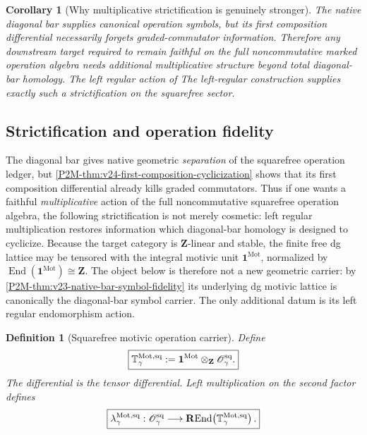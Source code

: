 \documentclass[11pt]{article}
\newtheorem{corollary}[theorem]{Corollary}
\newtheorem{definition}[theorem]{Definition}
\theoremstyle{remark}
\newcommand{\Z}{\mathbf Z}
\newcommand{\REnd}{\mathbf R\!\operatorname{End}}
\newcommand{\Mot}{\mathrm{Mot}}
\begin{document}
\begin{corollary}[Why multiplicative strictification is genuinely stronger]
\label{P2M-cor:v24-regular-strictification-necessary}
The native diagonal bar supplies canonical operation symbols, but its first
composition differential necessarily forgets graded-commutator information.
Therefore any downstream target required to remain faithful on the full
noncommutative marked operation algebra needs additional multiplicative
structure beyond total diagonal-bar homology.  The left regular action of
The left-regular construction supplies exactly such a strictification on the squarefree sector.
\end{corollary}


\subsection{Strictification and operation fidelity}

The diagonal bar gives native geometric \emph{separation} of the squarefree
operation ledger, but \cref{P2M-thm:v24-first-composition-cyclicization} shows that
its first composition differential already kills graded commutators.  Thus if
one wants a faithful \emph{multiplicative} action of the full noncommutative
squarefree operation algebra, the following strictification is not merely
cosmetic: left regular multiplication restores information which diagonal-bar
homology is designed to cyclicize.  Because the target category is $\Z$-linear and stable, the
finite free dg lattice may be tensored with the integral motivic unit
$\mathbf1^{\Mot}$, normalized by
$\operatorname{End}(\mathbf1^{\Mot})\cong\Z$.  The object below is therefore not a new
geometric carrier: by \cref{P2M-thm:v23-native-bar-symbol-fidelity} its underlying
dg motivic lattice is canonically the diagonal-bar symbol carrier.  The only
additional datum is its left regular endomorphism action.

\begin{definition}[Squarefree motivic operation carrier]
\label{P2M-def:v22-squarefree-motivic-operation-carrier}
Define
\begin{equation}
 \boxed{
 \mathbb T_{\gamma}^{\Mot,\rm sq}
 :=\mathbf 1^{\Mot}\otimes_{\Z}\mathscr O_{\gamma}^{\rm sq}.}
\end{equation}
The differential is the tensor differential.  Left multiplication on the
second factor defines
\begin{equation}
 \boxed{
 \lambda_{\gamma}^{\Mot,\rm sq}:
 \mathscr O_{\gamma}^{\rm sq}
 \longrightarrow
 \REnd\!\left(\mathbb T_{\gamma}^{\Mot,\rm sq}\right).}
\end{equation}
\end{definition}
\end{document}
